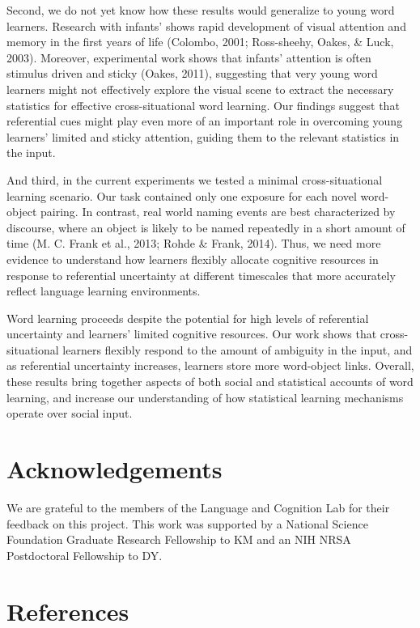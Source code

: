 \documentclass[12pt,]{article}
\begin{document}
Second, we do not yet know how these results would generalize to young
word learners. Research with infants' shows rapid development of visual
attention and memory in the first years of life (Colombo, 2001;
Ross-sheehy, Oakes, \& Luck, 2003). Moreover, experimental work shows
that infants' attention is often stimulus driven and sticky (Oakes,
2011), suggesting that very young word learners might not effectively
explore the visual scene to extract the necessary statistics for
effective cross-situational word learning. Our findings suggest that
referential cues might play even more of an important role in overcoming
young learners' limited and sticky attention, guiding them to the
relevant statistics in the input.

And third, in the current experiments we tested a minimal
cross-situational learning scenario. Our task contained only one
exposure for each novel word-object pairing. In contrast, real world
naming events are best characterized by discourse, where an object is
likely to be named repeatedly in a short amount of time (M. C. Frank et
al., 2013; Rohde \& Frank, 2014). Thus, we need more evidence to
understand how learners flexibly allocate cognitive resources in
response to referential uncertainty at different timescales that more
accurately reflect language learning environments.

Word learning proceeds despite the potential for high levels of
referential uncertainty and learners' limited cognitive resources. Our
work shows that cross-situational learners flexibly respond to the
amount of ambiguity in the input, and as referential uncertainty
increases, learners store more word-object links. Overall, these results
bring together aspects of both social and statistical accounts of word
learning, and increase our understanding of how statistical learning
mechanisms operate over social input.

\section{Acknowledgements}\label{acknowledgements}

We are grateful to the members of the Language and Cognition Lab for
their feedback on this project. This work was supported by a National
Science Foundation Graduate Research Fellowship to KM and an NIH NRSA
Postdoctoral Fellowship to DY.

\newpage

\section*{References}\label{references}
\end{document}
